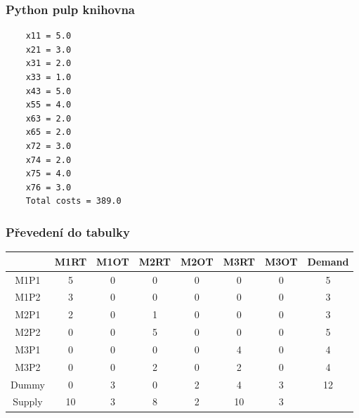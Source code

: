 \documentclass{article}%
\begin{document}
\subsubsection{Python pulp knihovna}
\begin{lstlisting}
    x11 = 5.0
    x21 = 3.0
    x31 = 2.0
    x33 = 1.0
    x43 = 5.0
    x55 = 4.0
    x63 = 2.0
    x65 = 2.0
    x72 = 3.0
    x74 = 2.0
    x75 = 4.0
    x76 = 3.0
    Total costs = 389.0
\end{lstlisting}

\subsubsection{Převedení do tabulky}
\begin{tabular}{c|ccccccc}
    & M1RT & M1OT & M2RT & M2OT & M3RT & M3OT & Demand \\
    \midrule
    M1P1   & 5    & 0    & 0    & 0    & 0    & 0    & 5      \\
    M1P2   & 3    & 0    & 0    & 0    & 0    & 0    & 3      \\
    M2P1   & 2    & 0    & 1    & 0    & 0    & 0    & 3      \\
    M2P2   & 0    & 0    & 5    & 0    & 0    & 0    & 5      \\
    M3P1   & 0    & 0    & 0    & 0    & 4    & 0    & 4      \\
    M3P2   & 0    & 0    & 2    & 0    & 2    & 0    & 4      \\
    Dummy  & 0    & 3    & 0    & 2    & 4    & 3    & 12     \\
    Supply & 10   & 3    & 8    & 2    & 10   & 3    &       
\end{tabular}


\newpage
\end{document}
